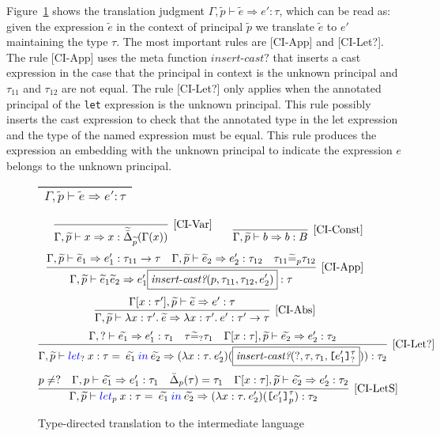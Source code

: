 \documentclass{article}
\newcommand{\emb}[3]{\texttt{[}#1\texttt{]}_{#2}^{#3}}
\newcommand{\tslam}[3]{\lambda #1 : #2. \: #3}
\newcommand{\plet}[5]{\textcolor[rgb]{0,0,1}{let}_{#1} \: {#2}:{#3} = \: #4 \: \textcolor[rgb]{0,0,1}{in} \: #5}
\newcommand\icode[1]{\texttt{#1}}
\newcommand\rulename[1]{\mathrm{\text{[#1]}}}
\newcommand\irname[1]{[#1]}
\newcommand\wt[1]{\widetilde{#1}}
\newcommand\liftedDeltaBar[2]{\wt{\bar{\Delta}}_{#1}(#2)}
\newcommand\cij[3]{\Gamma, \wt{p} \vdash #1 \Rightarrow #2 : #3 }
\newcommand\cixj[5]{\Gamma #1, #2 \vdash #3 \Rightarrow #4 : #5 }
\begin{document}
Figure~\ref{fig:Translation} shows the translation judgment $\cij{\wt{e}}{e'}{\tau}$, which can be read as: given the expression $\wt{e}$ in the context of principal $\wt{p}$ we translate $\wt{e}$ to $e'$ maintaining the type $\tau$. The most important rules are \irname{CI-App} and \irname{CI-Let?}. The rule \irname{CI-App} uses the meta function $insert\text{-}cast?$ that inserts a cast expression in the case that the principal in context is the unknown principal and $\tau_11$ and $\tau_12$ are not equal. The rule \irname{CI-Let?} only applies when the annotated principal of the \icode{let} expression is the unknown principal. This rule possibly inserts the cast expression to check that the annotated type in the let expression and the type of the named expression must be equal. This rule produces the expression an embedding with the unknown principal to indicate the expression $e$ belongs to the unknown principal.  

\begin{figure}[!htbp]
\begin{tabular}{ |c| } 
 \hline 
	$\cij{\wt{e}}{e'}{\tau}$  \\
 \hline
\end{tabular} 
\[
\begin{tabular}{c c} 
\infer[\rulename{CI-Var}] 
{\cij{x}{x}{\liftedDeltaBar{\wt{p}}{\Gamma(x)}}}{} & 
\infer[\rulename{CI-Const}] 
{\cij{b}{b}{B} }{} 
\end{tabular}
\]
\[
\infer[\rulename{CI-App}] 
{\cij{\wt{e}_1 \wt{e}_2}{e'_1 \boxed{\textit{insert-cast?}(p,\tau_{11},\tau_{12}, e'_2)}}{\tau}}
{\cij{\wt{e}_1}{e'_1}{\tau_{11} \rightarrow \tau}
\quad 
\cij{\wt{e}_2}{e'_2}{\tau_{12}} \quad \tau_{11} \wt{=}_p \tau_{12}}
\]
\[
\infer[\rulename{CI-Abs}] 
{\cij{\tslam{x}{\tau'}{\wt{e}}}{\tslam{x}{\tau'}{e'}}{\tau' \rightarrow \tau}}
{\cixj{[x : \tau']}{\wt{p}}{\wt{e}}{e'}{\tau}} 
\]
\[
\infer[\rulename{CI-Let?}] 
{\cij{\plet{?}{x}{\tau}{\wt{e_1}}{\wt{e_2}}}{(\tslam{x}{\tau}{e'_2}) 
(\boxed{\textit{insert-cast?}(?,\tau, \tau_1, \emb{e'_1}{?}{\tau}}))}{\tau_2}}
{\cixj{}{?}{\wt{e_1}}{e'_1}{\tau_1} \\ \quad 
\tau \wt{=}_? \tau_1 \quad 
\cixj{[x:\tau]}{\wt{p}}{\wt{e_2}}{e'_2}{\tau_2}} 
\]
\[
\infer[\rulename{CI-LetS}] 
{\cij{\plet{p}{x}{\tau}{\wt{e_1}}{\wt{e_2}}}{(\tslam{x}{\tau}{e'_2}) (\emb{e'_1}{p}{\tau})}{\tau_2} }
{p \neq ? \quad \cixj{}{p}{\wt{e_1}}{e'_1}{\tau_1} \quad 
\bar{\Delta}_{p}(\tau) = \tau_1 \quad 
\cixj{[x:\tau]}{\wt{p}}{\wt{e_2}}{e'_2}{\tau_2}} 
\]
\iffalse
\[
\begin{tabular}{c }
$\infer[\rulename{CI-Emb}] 
{\cij{\emb{\wt{e}}{?}{\tau}}{\emb{e}{?}{\tau}}{\wt{\bar{\Delta}}_\wt{p}(\tau)}}
{\cixj{}{\wt{p}_1}{\wt{e}}{e}{\tau_1} \quad  \tau_1 \hookleftarrow_{\wt{p}_1\overline{\wt{p}}}  \tau  } $ 
\end{tabular}
\]
\fi

\caption{Type-directed translation to the intermediate language}
		\label{fig:Translation}
	\end{figure}
\end{document}
